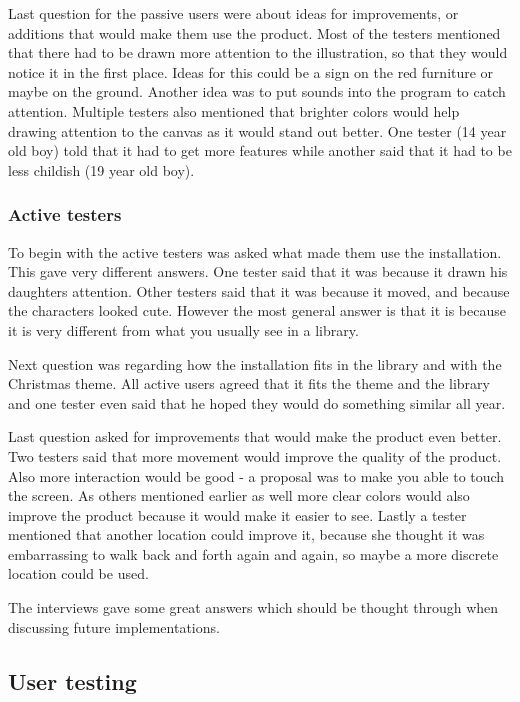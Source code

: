Last question for the passive users were about ideas for improvements, or additions that would make them use the product.
Most of the testers mentioned that there had to be drawn more attention to the illustration, so that they would notice it in the first place. Ideas for this could be a sign on the red furniture or maybe on the ground. Another idea was to put sounds into the program to catch attention. Multiple testers also mentioned that brighter colors would help drawing attention to the canvas as it would stand out better.
One tester (14 year old boy) told that it had to get more features while another said that it had to be less childish (19 year old boy).

\subsubsection{Active testers}
To begin with the active testers was asked what made them use the installation. This gave very different answers. One tester said that it was because it drawn his daughters attention. Other testers said that it was because it moved, and because the characters looked cute. However the most general answer is that it is because it is very different from what you usually see in a library.

Next question was regarding how the installation fits in the library and with the Christmas theme. All active users agreed that it fits the theme and the library and one tester even said that he hoped they would do something similar all year.

Last question asked for improvements that would make the product even better. Two testers said that more movement would improve the quality of the product. Also more interaction would be good - a proposal was to make you able to touch the screen.
As others mentioned earlier as well more clear colors would also improve the product because it would make it easier to see. Lastly a tester mentioned that another location could improve it, because she thought it was embarrassing to walk back and forth again and again, so maybe a more discrete location could be used.

The interviews gave some great answers which should be thought through when discussing future implementations.   
  
\subsection{User testing}





